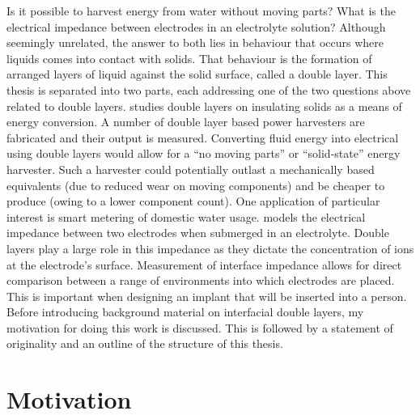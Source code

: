 



Is it possible to harvest energy from water without moving parts?
What is the electrical impedance between electrodes in an electrolyte solution?
Although seemingly unrelated, the answer to both lies in behaviour that occurs where liquids comes into contact with solids.
That behaviour is the formation of arranged layers of liquid against the solid surface, called a double layer.
This thesis is separated into two parts, each addressing one of the two questions above related to double layers.
 studies double layers on insulating solids as a means of energy conversion.
A number of double layer based power harvesters are fabricated and their output is measured.
Converting fluid energy into electrical using double layers would allow for a ``no moving parts'' or ``solid-state'' energy harvester.
Such a harvester could potentially outlast a mechanically based equivalents (due to reduced wear on moving components) and be cheaper to produce (owing to a lower component count).
One application of particular interest is smart metering of domestic water usage.
 models the electrical impedance between two electrodes when submerged in an electrolyte.
Double layers play a large role in this impedance as they dictate the concentration of ions at the electrode's surface.
Measurement of interface impedance allows for direct comparison between a range of environments into which electrodes are placed.
This is important when designing an implant that will be inserted into a person.
Before introducing background material on interfacial double layers, my motivation for doing this work is discussed.
This is followed by a statement of originality and an outline of the structure of this thesis.


\section{Motivation}
  \label{sect:introduction_motiviation}


